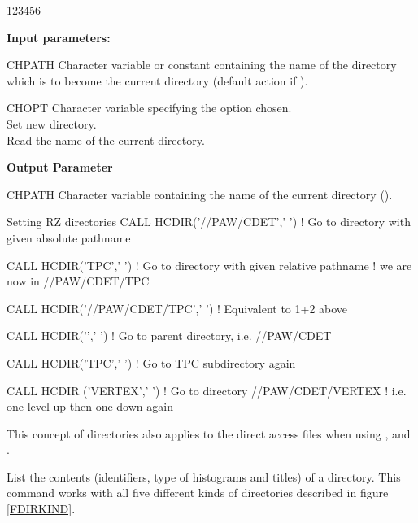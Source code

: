 \begin{DLtt}{123456}
\item[{\rm\bf Input parameters:}]
\item[CHPATH] Character
variable or constant containing the name of the directory which
is to become the current directory (default action if ).
\item[CHOPT] Character variable specifying the option chosen.\\
 Set new directory.\\
 Read the name of the current directory.
\item[{\rm\bf Output Parameter}]
\item[CHPATH] Character
variable containing the name of the current directory ().
\end{DLtt}
 
\begin{XMPt}{Setting RZ directories}
CALL HCDIR('//PAW/CDET',' ')     ! {\rm Go to directory with given absolute pathname}
                                   
CALL HCDIR('TPC',' ')            ! {\rm Go to directory with given relative pathname}
                                 ! {\rm we are now in} //PAW/CDET/TPC

CALL HCDIR('//PAW/CDET/TPC',' ') ! {\rm Equivalent to 1+2 above}

CALL HCDIR('\bs',' ')              ! {\rm Go to parent directory, i.e.} //PAW/CDET

CALL HCDIR('TPC',' ')            ! {\rm Go to TPC subdirectory again}

CALL HCDIR ('\bs{}VERTEX',' ')       ! {\rm Go to directory} //PAW/CDET/VERTEX
                                 ! {\rm i.e. one level up then one down again}
\end{XMPt}

This concept of directories also applies to
the direct access files when using , 
and .

\finalnewpage
{}
 
\Action
List the contents (identifiers, type of histograms
and titles) of a \HBOOK{} directory.
This command works with all five different kinds of directories 
described in figure \ref{FDIRKIND}.
 
